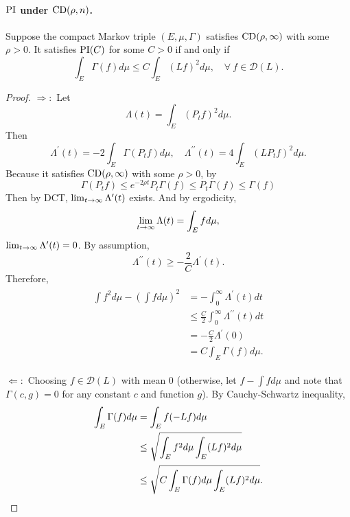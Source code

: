 \paragraph{$\operatorname{PI}$ under $\operatorname{CD}(\rho,n)$.} 

\begin{lem}
    Suppose the compact Markov triple $(E,\mu,\Gamma)$ satisfies $\operatorname{CD}(\rho,\infty)$ with some $\rho > 0$. It satisfies $\operatorname{PI}(C)$ for some $C > 0$ if and only if
    \begin{equation*}
    	\int_E \Gamma(f) d \mu \leq C \int_E(L f)^2 d \mu,\quad \forall~ f\in \mathcal{D}(L).
    \end{equation*}
\end{lem}
\begin{proof}
    $\Rightarrow:$ Let
    \begin{equation*}
    	\Lambda(t)=\int_E\left(P_t f\right)^2 d \mu.
    \end{equation*}
    Then
    \begin{equation*}
    	\Lambda^{\prime}(t)=-2 \int_E \Gamma\left(P_t f\right) d \mu,\quad \Lambda^{\prime \prime}(t)=4 \int_E\left(L P_t f\right)^2 d \mu.
    \end{equation*}
    Because it satisfies $\operatorname{CD}(\rho,\infty)$ with some $\rho > 0$, by
    \begin{equation*}
    	\Gamma(P_tf) \leq e^{-2\rho t}P_t \Gamma(f) \leq P_t \Gamma(f) \leq \Gamma(f)
    \end{equation*}
    Then by DCT, $\lim_{t \rightarrow \infty} \Lambda^\prime(t)$ exists. And by ergodicity,
    \begin{equation*}
    	\lim_{t \rightarrow \infty} \Lambda(t) = \int_E f d\mu,
    \end{equation*}
    $\lim_{t \rightarrow \infty} \Lambda^\prime(t) = 0$. By assumption,
    \begin{equation*}
    	\Lambda^{\prime \prime}(t) \geq-\frac{2}{C} \Lambda^{\prime}(t).
    \end{equation*}
    Therefore,
    \begin{align*}
    	\begin{aligned}
			\int f^2 d \mu-\left(\int f d \mu\right)^2 & =-\int_0^{\infty} \Lambda^{\prime}(t) d t \\
			& \leq \frac{C}{2} \int_0^{\infty} \Lambda^{\prime \prime}(t) d t \\
			& =-\frac{C}{2} \Lambda^{\prime}(0) \\
			& =C \int_E \Gamma(f) d \mu.
		\end{aligned}
    \end{align*}

    $\Leftarrow:$ Choosing $f \in \mathcal{D}(L)$ with mean $0$ (otherwise, let $f - \int f d\mu$ and note that $\Gamma(c,g) = 0$ for any constant $c$ and function $g$). By Cauchy-Schwartz inequality,
    \begin{align*}
		\int_E \Gamma(f) d \mu & =\int_E f(-L f) d \mu \\
		& \leq \sqrt{\int_E f^2 d \mu \int_E(L f)^2 d \mu} \\
		& \leq \sqrt{C \int_E \Gamma(f) d \mu \int_E(L f)^2 d \mu}. \qedhere
    \end{align*}
\end{proof}

